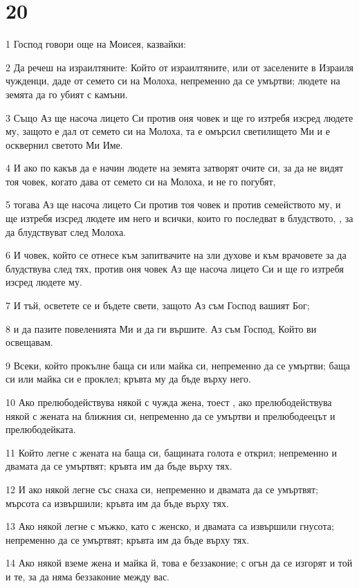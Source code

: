 \chapter{20}

\par 1 Господ говори още на Моисея, казвайки:
\par 2 Да речеш на израилтяните: Който от израилтяните, или от заселените в Израиля чужденци, даде от семето си на Молоха, непременно да се умъртви; людете на земята да го убият с камъни.
\par 3 Също Аз ще насоча лицето Си против оня човек и ще го изтребя изсред людете му, защото е дал от семето си на Молоха, та е омърсил светилището Ми и е осквернил светото Ми Име.
\par 4 И ако по какъв да е начин людете на земята затворят очите си, за да не видят тоя човек, когато дава от семето си на Молоха, и не го погубят,
\par 5 тогава Аз ще насоча лицето Си против тоя човек и против семейството му, и ще изтребя изсред людете им него и всички, които го последват в блудството, , за да блудствуват след Молоха.
\par 6 И човек, който се отнесе към запитвачите на зли духове и към врачовете за да блудствува след тях, против оня човек Аз ще насоча лицето Си и ще го изтребя изсред людете му.
\par 7 И тъй, осветете се и бъдете свети, защото Аз съм Господ вашият Бог;
\par 8 и да пазите повеленията Ми и да ги вършите. Аз съм Господ, Който ви освещавам.
\par 9 Всеки, който прокълне баща си или майка си, непременно да се умъртви; баща си или майка си е проклел; кръвта му да бъде върху него.
\par 10 Ако прелюбодействува някой с чужда жена, тоест , ако прелюбодействува някой с жената на ближния си, непременно да се умъртви и прелюбодеецът и прелюбодейката.
\par 11 Който легне с жената на баща си, бащината голота е открил; непременно и двамата да се умъртвят; кръвта им да бъде върху тях.
\par 12 И ако някой легне със снаха си, непременно и двамата да се умъртвят; мърсота са извършили; кръвта им да бъде върху тях.
\par 13 Ако някой легне с мъжко, като с женско, и двамата са извършили гнусота; непременно да се умъртвят; кръвта им да бъде върху тях.
\par 14 Ако някой вземе жена и майка й, това е беззаконие; с огън да се изгорят и той и те, за да няма беззаконие между вас.
